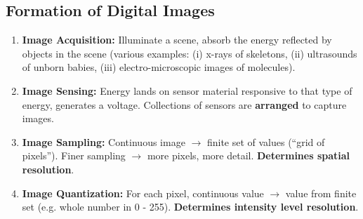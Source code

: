 \begin{figure}[H]
  \centering
\end{figure}

\subsection*{Formation of Digital Images}

\begin{enumerate}
  \item \textbf{Image Acquisition:} Illuminate a scene, absorb the
    energy reflected by objects in the scene (various examples: (i)
      x-rays of skeletons, (ii) ultrasounds of unborn babies, (iii)
    electro-microscopic images of molecules).
  \item \textbf{Image Sensing:} Energy lands on sensor material
    responsive to that type of energy, generates a voltage.
    Collections of sensors are \textbf{arranged} to capture images.
  \item \textbf{Image Sampling:} Continuous image $\rightarrow$
    finite set of values (\enquote{grid of pixels}). Finer sampling
    $\rightarrow$ more pixels, more detail. \textbf{Determines
    spatial resolution}.
  \item \textbf{Image Quantization:} For each pixel, continuous value
    $\rightarrow$ value from finite set (e.g. whole number in 0 -
    255). \textbf{Determines intensity level resolution}.
\end{enumerate}

